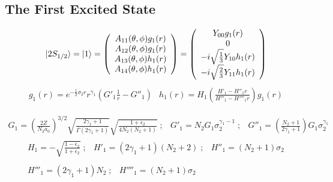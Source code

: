     \subsection{The First Excited State}
    \begin{equation}
	|2S_{1/2} \rangle = |1 \rangle = 
		\left(
			\begin{array}{c}
				A_{11}(\theta,\phi) g_1(r) \\
				A_{12}(\theta,\phi) g_1(r) \\
				A_{13}(\theta,\phi) h_1(r) \\
				A_{14}(\theta,\phi) h_1(r)
			\end{array}
		\right)
		=
		\left(
			\begin{array}{c}
				Y_{00} 	g_1(r)	\\
				0	 			\\
				-i \sqrt{\frac{1}{3}} Y_{10} h_1(r) \\
				-i \sqrt{\frac{2}{3}} Y_{11} h_1(r)
			\end{array}
		\right)
\end{equation}
\begin{equation}
\begin{array}{cc}
	g_1(r) = e^{-\frac{1}{2} \sigma_2 r} r^{\gamma_1} 
	  		  \left( G'_{1}  \frac{1}{r} - G''_{1} \right) 
    &
   	h_1(r) = H_1 \left( \frac{H'_1 - H''_1 r}{H'''_1 - H''''_1 r} \right) g_1(r)
\end{array}
\end{equation}

\begin{equation*}
\begin{array}{ccc}
	G_1 	 =  \left( \frac{2Z}{N_2 a_0} \right)^{3/2}
		  	  		\sqrt{\frac{2\gamma_1 + 1}{\Gamma(2\gamma_1 + 1)}} 
		  	  		\sqrt{\frac{1 + \epsilon_2}{4N_2 (N_2 + 1)}} 
    \; ; &
	G'_1 	 =  N_2 G_1 \sigma_2^{\gamma_1 - 1} 
    \; ; &
	G''_1 	 =  \left( \frac{N_2 + 1}{2\gamma_1 + 1} \right) G_1 \sigma_2^{\gamma_1}
\end{array}
\end{equation*}
\begin{equation*}
\begin{split}
\begin{array}{ccc}
	H_1 	 =  -\sqrt{\frac{1 - \epsilon_2}{1 + \epsilon_2}}  
    \; ; &
	H'_1 	 =  (2\gamma_1 + 1)(N_2 + 2)  
    \; ; &
	H''_1 	 =  (N_2 + 1)\sigma_2  
\end{array}
\\
\begin{array}{cc}
	H'''_1 	 =  (2\gamma_1 + 1)N_2  
    \; ; &
	H''''_1  =  (N_2 + 1)\sigma_2 
\end{array}
\end{split}
\end{equation*}

